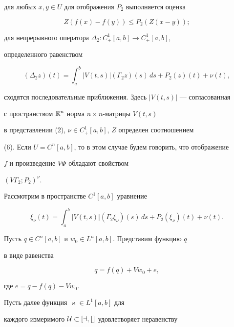 для любых $x,y\in U$ для отображения $P_2$ выполняется оценка


$$


Z(f(x)-f(y))\le P_2(Z(x-y));


$$


для непрерывного оператора $\Delta_2:C^1_+[a,b]\to C^1_+[a,b]$,


определенного равенством


$$


(\Delta_2 z)(t)=\int_a^b |V(t,s)|(\Gamma_2 z)(s)\,ds


+P_2 (z)(t)+\nu(t),


$$


сходятся последовательные приближения. Здесь $|V(t,s)|$ --- согласованная


с пространством $\Bbb R^n$ норма $n\times n$-матрицы $V(t,s)$


в представлении (2), $\nu\in C^1_+[a,b]$, $Z$ определен соотношением


(6). Если $U=C^n[a,b]$, то в этом случае будем говорить, что отображение


$f$ и произведение $V\Phi$ обладают свойством


$(V\Gamma_2;P_2)^\nu$.





Рассмотрим в пространстве $C^1[a,b]$ уравнение


\begin{equation}


\xi_\nu(t)=\int_a^b |V(t,s)|(\Gamma_2 \xi_\nu)(s)\,ds


+P_2(\xi_\nu)(t)+\nu(t).


\end{equation}





Пусть $q\in C^n[a,b]$ и $w_0\in L^n[a,b]$. Представим функцию $q$


в виде равенства


\begin{equation}


q=f(q)+V{w_0}+e,


\end{equation}


где $e=q-f(q)-Vw_0$.





Пусть далее функция $\varkappa \in L^1[a,b]$ для


каждого измеримого $\cal U\subset[a,b]$ удовлетворяет неравенству


